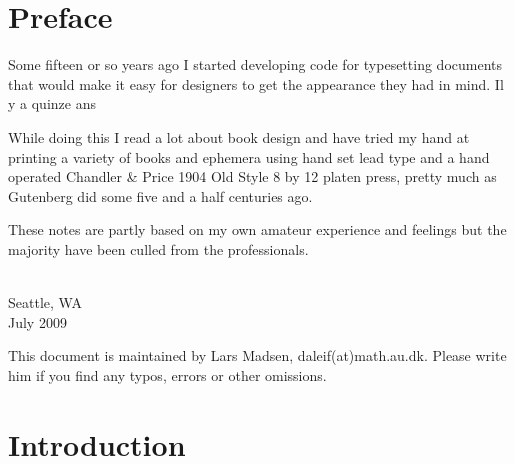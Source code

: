 \documentclass[10pt,a4paper,oneside,extrafontsizes]{memoir}%
\begin{document}


\tableofcontents

\endgroup




\setlength{\unitlength}{1pt}
\clearpage 
\listoffigures
\clearpage
\listoftables
\clearpage

\chapter{Preface}

\begin{paracol}{2}
\switchEng
    Some fifteen or so years ago I started developing code for typesetting
documents that would make it easy for designers to get the appearance
they had in mind.
\switchFrench
    Il y a quinze ans

\switchEng
\switchFrench

\switchEng
   While doing this I read a lot about book design and have tried my hand
at printing a variety of books and ephemera using hand set lead type 
and a hand operated Chandler \& Price 1904 Old Style 8 by 12 platen
press, pretty much as Gutenberg did some five and a half centuries ago.

\switchEng
   These notes are partly based on my own amateur
experience and feelings but the majority have been culled from the
professionals.

\switchEng
{ \\ Seattle, WA \\ July 2009\par}


\vskip 3cm

\switchEng
\noindent
This document is maintained by Lars Madsen,
daleif(at)math.au.dk. Please write him if you find any typos, errors or
other omissions.

\end{paracol}






\chapter{Introduction}
\end{document}
